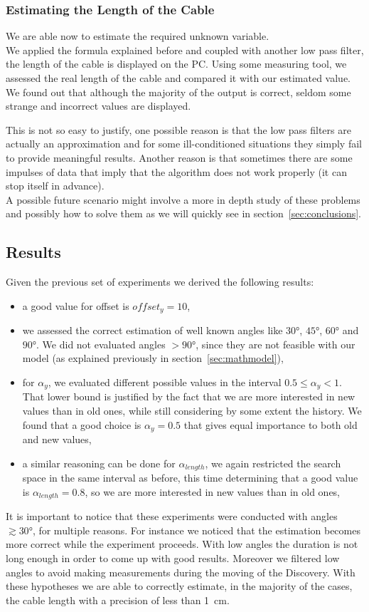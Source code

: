 \subsubsection{Estimating the Length of the Cable}
We are able now to estimate the required unknown variable. \\ We applied the formula explained before and coupled with another low pass filter, the length of the cable is displayed on the PC. Using some measuring tool, we assessed the real length of the cable and compared it with our estimated value. We found out that although the majority of the output is correct, seldom some strange and incorrect values are displayed. \par This is not so easy to justify, one possible reason is that the low pass filters are actually an approximation and for some ill-conditioned situations they simply fail to provide meaningful results. Another reason is that sometimes there are some impulses of data that imply that the algorithm does not work properly (it can stop itself in advance).\\
A possible future scenario might involve a more in depth study of these problems and possibly how to solve them as we will quickly see in section~\ref{sec:conclusions}.
\subsection{Results}
\label{sec:results}
Given the previous set of experiments we derived the following results:
\begin{itemize}
	\item a good value for offset is $offset_y = 10$,
	\item we assessed the correct estimation of well known angles like $30\si{\degree}$, $45\si{\degree}$, $60\si{\degree}$ and $90\si{\degree}$. We did not evaluated angles $> 90\si{\degree}$, since they are not feasible with our model (as explained previously in section~\ref{sec:mathmodel}),
	\item for $\alpha_y$, we evaluated different possible values in the interval $0.5 \leq \alpha_y < 1 $. That lower bound is justified by the fact that we are more interested in new values than in old ones, while still considering by some extent the history. We found that a good choice is $\alpha_y = 0.5$ that gives equal importance to both old and new values,
	\item a similar reasoning can be done for $\alpha_{length}$, we again restricted the search space in the same interval as before, this time determining that a good value is $\alpha_{length} = 0.8$, so we are more interested in new values than in old ones,
\end{itemize}
It is important to notice that these experiments were conducted with angles $\gtrsim 30\si{\degree}$, for multiple reasons. For instance we noticed that the estimation becomes more correct while the experiment proceeds. With low angles the duration is not long enough in order to come up with good results. Moreover we filtered low angles to avoid making measurements during the moving of the Discovery.
With these hypotheses we are able to correctly estimate, in the majority of the cases, the cable length with a precision of less than \SI{1}{\cm}.
\pagebreak

